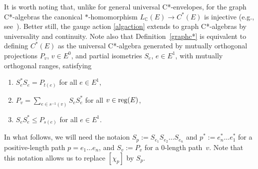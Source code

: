 \documentclass[12pt,times,a4paper]{amsart}
\numberwithin{equation}{section}
\numberwithin{equation}{section}
\begin{document}
It is worth noting that, unlike for general universal C*-envelopes, for the graph C*-algebras the canonical $*$-homomorphism 
$L_\mathbb{C}(E)\to C^*(E)$ is injective (e.g., see~\cite[Theorem~5.2.9]{aasm17}). Better still, the gauge action \eqref{algaction}
extends to graph C*-algebras by
universality and continuity.
Note also that  Definition~\ref{graphc*} is equivalent to~\cite[Definition~1]{flr00} defining $C^*(E)$ as the universal C*-algebra 
generated by mutually orthogonal projections $P_v$, $v\in E^0$, and partial isometries $S_e$, $e\in E^1$, with mutually 
orthogonal ranges, satisfying
\begin{enumerate}
\item $S^*_eS_e=P_{t(e)}$ for all $e\in E^1$,
\item $P_v=\sum_{e\in s^{-1}(v)}S_eS_e^*$ for all $v\in {\rm reg}(E)$,
\item $S_eS_e^*\leq P_{s(e)}$ for all $e\in E^1$.
\end{enumerate}
In what follows, we will need the notaion $S_p:=S_{e_1}S_{e_2}\ldots S_{e_n}$ and $p^*:=e_n^*\ldots e_1^*$
 for a positive-length path $p=e_1\ldots e_n$, and $S_v:=P_v$ for a 0-length path~$v$. Note that this notation allows us to replace $[\chi_p]$ by $S_p$.
\end{document}
